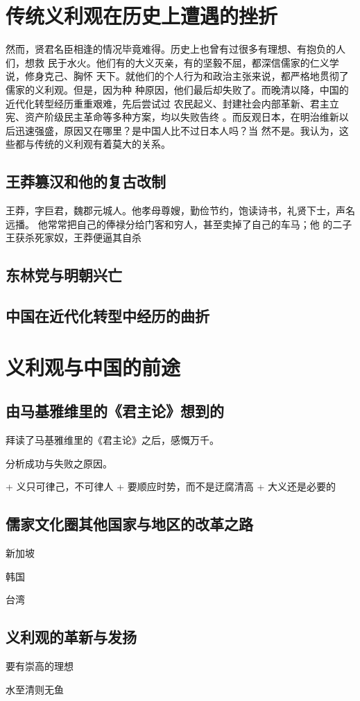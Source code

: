 \section{传统义利观在历史上遭遇的挫折}

然而，贤君名臣相逢的情况毕竟难得。历史上也曾有过很多有理想、有抱负的人们，想救
民于水火。他们有的大义灭亲，有的坚毅不屈，都深信儒家的仁义学说，修身克己、胸怀
天下。就他们的个人行为和政治主张来说，都严格地贯彻了儒家的义利观。但是，因为种
种原因，他们最后却失败了。而晚清以降，中国的近代化转型经历重重艰难，先后尝试过
农民起义、封建社会内部革新、君主立宪、资产阶级民主革命等多种方案，均以失败告终
。而反观日本，在明治维新以后迅速强盛，原因又在哪里？是中国人比不过日本人吗？当
然不是。我认为，这些都与传统的义利观有着莫大的关系。

\subsection{王莽篡汉和他的复古改制}

王莽，字巨君，魏郡元城人。他孝母尊嫂，勤俭节约，饱读诗书，礼贤下士，声名远播。
\parencite{wkpd-wm}他常常把自己的俸禄分给门客和穷人，甚至卖掉了自己的车马；他
的二子王获杀死家奴，王莽便逼其自杀

\subsection{东林党与明朝兴亡}

\subsection{中国在近代化转型中经历的曲折}

\section{义利观与中国的前途}

\subsection{由马基雅维里的《君主论》想到的}

拜读了马基雅维里的《君主论》之后，感慨万千。

分析成功与失败之原因。

+ 义只可律己，不可律人
+ 要顺应时势，而不是迂腐清高
+ 大义还是必要的

\subsection{儒家文化圈其他国家与地区的改革之路}

新加坡

韩国

台湾

\subsection{义利观的革新与发扬}

要有崇高的理想

水至清则无鱼

\printbibliography
\nocite{*}


